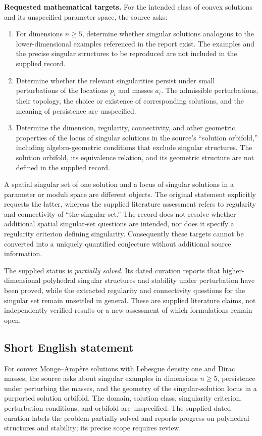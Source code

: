 \documentclass[11pt]{article}
\begin{document}
\textbf{Requested mathematical targets.} For the intended class of convex solutions and its unspecified parameter space, the source asks:
\begin{enumerate}
\item For dimensions \(n\geq5\), determine whether singular solutions analogous to the lower-dimensional examples referenced in the report exist. The examples and the precise singular structures to be reproduced are not included in the supplied record.
\item Determine whether the relevant singularities persist under small perturbations of the locations \(p_i\) and masses \(a_i\). The admissible perturbations, their topology, the choice or existence of corresponding solutions, and the meaning of persistence are unspecified.
\item Determine the dimension, regularity, connectivity, and other geometric properties of the locus of singular solutions in the source's ``solution orbifold,'' including algebro-geometric conditions that exclude singular structures. The solution orbifold, its equivalence relation, and its geometric structure are not defined in the supplied record.
\end{enumerate}
A spatial singular set of one solution and a locus of singular solutions in a parameter or moduli space are different objects. The original statement explicitly requests the latter, whereas the supplied literature assessment refers to regularity and connectivity of ``the singular set.'' The record does not resolve whether additional spatial singular-set questions are intended, nor does it specify a regularity criterion defining singularity. Consequently these targets cannot be converted into a uniquely quantified conjecture without additional source information.

The supplied status is \emph{partially solved}. Its dated curation reports that higher-dimensional polyhedral singular structures and stability under perturbation have been proved, while the extracted regularity and connectivity questions for the singular set remain unsettled in general. These are supplied literature claims, not independently verified results or a new assessment of which formulations remain open.
\subsection{Short English statement}
For convex Monge--Amp\`ere solutions with Lebesgue density one and Dirac masses, the source asks about singular examples in dimensions \(n\geq5\), persistence under perturbing the masses, and the geometry of the singular-solution locus in a purported solution orbifold. The domain, solution class, singularity criterion, perturbation conditions, and orbifold are unspecified. The supplied dated curation labels the problem partially solved and reports progress on polyhedral structures and stability; its precise scope requires review.
\end{document}
